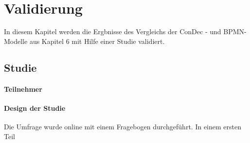 \chapter{Validierung}\label{sec:chapter7}

In diesem Kapitel werden die Ergbnisse des Vergleichs der ConDec - und BPMN-Modelle aus Kapitel 6 mit Hilfe einer Studie validiert.

\section{Studie}

\subsubsection{Teilnehmer}

\subsubsection{Design der Studie}
Die Umfrage wurde online mit einem Fragebogen durchgeführt.
In einem ersten Teil 